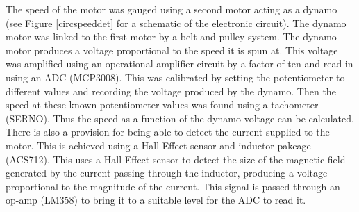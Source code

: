 \documentclass[twoside,a4]{report}
\def\br{\newline \newline \noindent}
\begin{document}
	The speed of the motor was gauged using a second motor acting as a dynamo (see Figure \ref{circspeeddet} for a schematic of the electronic circuit). The dynamo motor was linked to the first motor by a belt and pulley system. The dynamo motor produces a voltage proportional to the speed it is spun at. This voltage was amplified using an operational amplifier circuit by a factor of ten and read in using an ADC (MCP3008). This was calibrated by setting the potentiometer to different values and recording the voltage produced by the dynamo. Then the speed at these known potentiometer values was found using a tachometer (SERNO). Thus the speed as a function of the dynamo voltage can be calculated. \br
	There is also a provision for being able to detect the current supplied to the motor. This is achieved using a Hall Effect sensor and inductor pakcage (ACS712). This uses a Hall Effect sensor to detect the size of the magnetic field generated by the current passing through the inductor, producing a voltage proportional to the magnitude of the current. This signal is passed through an op-amp (LM358) to bring it to a suitable level for the ADC to read it.
	
\end{document}

